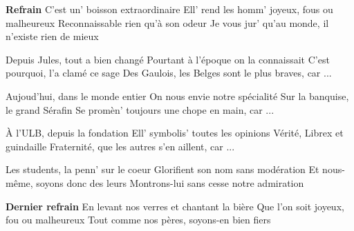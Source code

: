 \footnotemark [
ititle={Boisson extraordinaire (Une)},
tu={Le jardin extraordinaire (Charles Trénet)}]


\beginchorus
\textbf{Refrain}
C'est un' boisson extraordinaire
Ell' rend les homm' joyeux, fous ou malheureux
Reconnaissable rien qu'à son odeur
Je vous jur' qu'au monde, il n'existe rien de mieux
\endchorus

\beginverse
Depuis Jules, tout a bien changé
Pourtant à l'époque on la connaissait
C'est pourquoi, l'a clamé ce sage
Des Gaulois, les Belges sont le plus braves, car ...
\endverse

\beginverse
Aujoud'hui, dans le monde entier
On nous envie notre spécialité
Sur la banquise, le grand Sérafin
Se promèn' toujours une chope en main, car ...
\endverse

\beginverse
À l'ULB, depuis la fondation
Ell' symbolis' toutes les opinions
Vérité, Librex et guindaille
Fraternité, que les autres s'en aillent, car ...
\endverse

\beginverse
Les students, la penn' sur le coeur
Glorifient son nom sans modération
Et nous-même, soyons donc des leurs
Montrons-lui sans cesse notre admiration
\endverse

\beginchorus
\textbf{Dernier refrain}
En levant nos verres et chantant la bière
Que l'on soit joyeux, fou ou malheureux
Tout comme nos pères, soyons-en bien fiers
\endchorus
\endsong